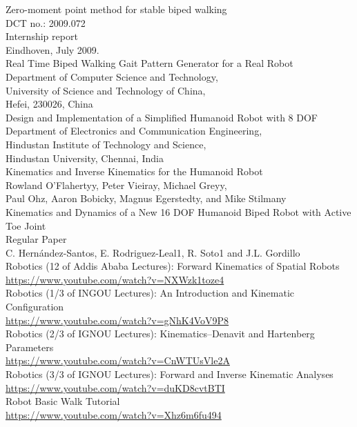 \documentclass[12pt]{article}
\begin{document}
 \begin{thebibliography}{99}
  Zero-moment point method for stable biped walking\\
DCT no.: 2009.072\\
Internship report\\
Eindhoven, July 2009.\\

 Real Time Biped Walking Gait Pattern Generator for a Real Robot\\
Department of Computer Science and Technology,\\
University of Science and Technology of China,\\
Hefei, 230026, China\\

 Design and Implementation of a Simplified Humanoid Robot with 8 DOF\\
Department of Electronics and Communication Engineering,\\ Hindustan Institute of
Technology and Science,\\ Hindustan University, Chennai, India\\

 Kinematics and Inverse Kinematics for the Humanoid Robot\\
Rowland O’Flahertyy, Peter Vieiray, Michael Greyy,\\
Paul Ohz, Aaron Bobicky, Magnus Egerstedty, and Mike Stilmany\\

 Kinematics and Dynamics of a New 16 DOF Humanoid Biped Robot with Active Toe Joint\\
Regular Paper\\
C. Hernández-Santos, E. Rodriguez-Leal1, R. Soto1 and J.L. Gordillo\\

\newpage
{} Robotics (12 of Addis Ababa Lectures): Forward Kinematics of Spatial Robots\\
\url{https://www.youtube.com/watch?v=NXWzk1toze4}\\

Robotics (1/3 of INGOU Lectures): An Introduction and Kinematic Configuration\\
\url{https://www.youtube.com/watch?v=gNhK4VoV9P8}\\

Robotics (2/3 of IGNOU Lectures): Kinematics--Denavit and Hartenberg Parameters\\
\url{https://www.youtube.com/watch?v=CnWTUsVle2A}\\

Robotics (3/3 of IGNOU Lectures): Forward and Inverse Kinematic Analyses\\
\url{https://www.youtube.com/watch?v=duKD8cvtBTI}\\

Robot Basic Walk Tutorial\\
\url{https://www.youtube.com/watch?v=Xhz6m6fu494}\\

 \end{thebibliography}
\end{document}
